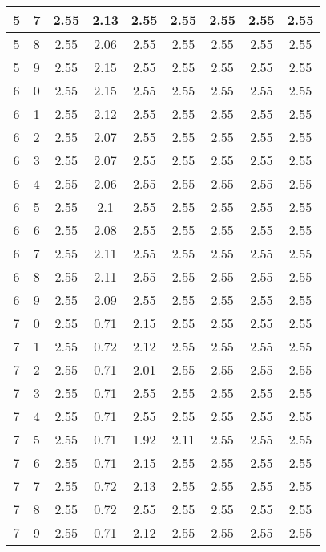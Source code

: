 \begin{longtable}{|c|c||c||c|c|c||c|c|c|}
	5 & 7 & 2.55 & 2.13 & 2.55 & 2.55 & 2.55 & 2.55 & 2.55 \\ \hline
	5 & 8 & 2.55 & 2.06 & 2.55 & 2.55 & 2.55 & 2.55 & 2.55 \\ \hline
	5 & 9 & 2.55 & 2.15 & 2.55 & 2.55 & 2.55 & 2.55 & 2.55 \\ \hline
	6 & 0 & 2.55 & 2.15 & 2.55 & 2.55 & 2.55 & 2.55 & 2.55 \\ \hline
	6 & 1 & 2.55 & 2.12 & 2.55 & 2.55 & 2.55 & 2.55 & 2.55 \\ \hline
	6 & 2 & 2.55 & 2.07 & 2.55 & 2.55 & 2.55 & 2.55 & 2.55 \\ \hline
	6 & 3 & 2.55 & 2.07 & 2.55 & 2.55 & 2.55 & 2.55 & 2.55 \\ \hline
	6 & 4 & 2.55 & 2.06 & 2.55 & 2.55 & 2.55 & 2.55 & 2.55 \\ \hline
	6 & 5 & 2.55 & 2.1 & 2.55 & 2.55 & 2.55 & 2.55 & 2.55 \\ \hline
	6 & 6 & 2.55 & 2.08 & 2.55 & 2.55 & 2.55 & 2.55 & 2.55 \\ \hline
	6 & 7 & 2.55 & 2.11 & 2.55 & 2.55 & 2.55 & 2.55 & 2.55 \\ \hline
	6 & 8 & 2.55 & 2.11 & 2.55 & 2.55 & 2.55 & 2.55 & 2.55 \\ \hline
	6 & 9 & 2.55 & 2.09 & 2.55 & 2.55 & 2.55 & 2.55 & 2.55 \\ \hline
	7 & 0 & 2.55 & 0.71 & 2.15 & 2.55 & 2.55 & 2.55 & 2.55 \\ \hline
	7 & 1 & 2.55 & 0.72 & 2.12 & 2.55 & 2.55 & 2.55 & 2.55 \\ \hline
	7 & 2 & 2.55 & 0.71 & 2.01 & 2.55 & 2.55 & 2.55 & 2.55 \\ \hline
	7 & 3 & 2.55 & 0.71 & 2.55 & 2.55 & 2.55 & 2.55 & 2.55 \\ \hline
	7 & 4 & 2.55 & 0.71 & 2.55 & 2.55 & 2.55 & 2.55 & 2.55 \\ \hline
	7 & 5 & 2.55 & 0.71 & 1.92 & 2.11 & 2.55 & 2.55 & 2.55 \\ \hline
	7 & 6 & 2.55 & 0.71 & 2.15 & 2.55 & 2.55 & 2.55 & 2.55 \\ \hline
	7 & 7 & 2.55 & 0.72 & 2.13 & 2.55 & 2.55 & 2.55 & 2.55 \\ \hline
	7 & 8 & 2.55 & 0.72 & 2.55 & 2.55 & 2.55 & 2.55 & 2.55 \\ \hline
	7 & 9 & 2.55 & 0.71 & 2.12 & 2.55 & 2.55 & 2.55 & 2.55 \\ \hline
\end{longtable}
\clearpage{}
